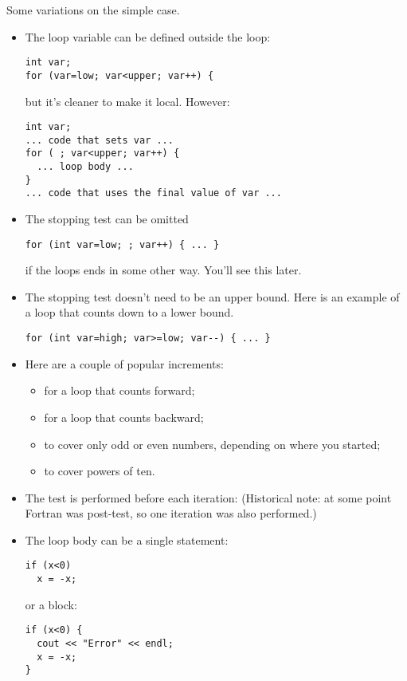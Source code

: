 Some variations on the simple case.
\begin{itemize}
\item The loop variable can be defined outside the loop:
\begin{verbatim}
int var;
for (var=low; var<upper; var++) {
\end{verbatim}
but it's cleaner to make it local. However:
\begin{verbatim}
int var;
... code that sets var ...
for ( ; var<upper; var++) {
  ... loop body ...
}
... code that uses the final value of var ...
\end{verbatim}
\item The stopping test can be omitted
\begin{verbatim}
for (int var=low; ; var++) { ... }
\end{verbatim}
if the loops ends in some other way. You'll see this later.
\item The stopping test doesn't need to be an upper bound. Here is an
  example of a loop that counts down to a lower bound.
\begin{verbatim}
for (int var=high; var>=low; var--) { ... }
\end{verbatim}
\item Here are a couple of popular increments:
  \begin{itemize}
  \item {} for a loop that counts forward;
  \item {} for a loop that counts backward;
  \item {} to cover only odd or even numbers, depending on
    where you started;
  \item {} to cover powers of ten.
  \end{itemize}
\item The test is performed before each iteration:
  (Historical note: at some point Fortran was post-test, so one
  iteration was also performed.)
\item The loop body can be a single statement:
\begin{verbatim}
if (x<0)
  x = -x;
\end{verbatim}
or a block:
\begin{verbatim}
if (x<0) {
  cout << "Error" << endl;
  x = -x;
}
\end{verbatim}
\end{itemize}

